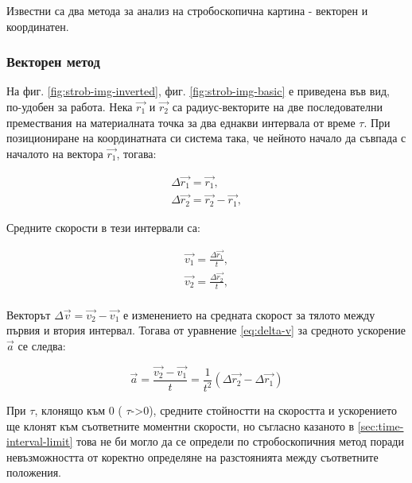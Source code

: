 \documentclass[12pt]{article}
\newcommand*{\fullref}[1]{\ref*{#1}} %
\begin{document}
Известни са два метода за анализ на стробоскопична картина - векторен и координатен.

\subsubsection{Векторен метод}
На фиг. \ref{fig:strob-img-inverted}, фиг. \ref{fig:strob-img-basic} е приведена във вид, по-удобен за работа. Нека \(\vec{r_1}\) и \(\vec{r_2}\) са радиус-векторите на две последователни премествания на материалната точка за два еднакви интервала от време \(\tau\). При позициониране на координатната си система така, че нейното начало да съвпада с началото на вектора \(\vec{r_1}\), тогава:

\begin{equation}\label{eq:delta-r}
\begin{aligned}
\Delta \vec{r_1} = \vec{r_1}, \\
\Delta \vec{r_2} = \vec{r_2} - \vec{r_1},
\end{aligned}
\end{equation}

Средните скорости в тези интервали са:

\begin{equation}\label{eq:delta-v}
\begin{aligned}
\vec{v_1} = \frac{\Delta \vec{r_1}}{t}, \\
\vec{v_2} = \frac{\Delta \vec{r_2}}{t}, \\
\end{aligned}
\end{equation}

Векторът \(\Delta \vec{v} = \vec{v_2} - \vec{v_1}\) е изменението на средната скорост за тялото между първия и втория интервал. Тогава от уравнение \ref{eq:delta-v} за средното ускорение \(\vec{a}\) се следва:

\begin{equation}\label{eq:a}
\vec{a} = \frac{\vec{v_2} - \vec{v_1}}{t} = \frac{1}{t^2}(\Delta \vec{r_2} - \Delta \vec{r_1})
\end{equation}

При  \(\tau\), клонящо към 0 ( \(\tau\)->0), средните стойностти на скоростта и ускорението ще клонят към съответните моментни скорости, но съгласно казаното в \fullref{sec:time-interval-limit} това не би могло да се определи по стробоскопичния метод поради невъзможността от коректно определяне на разстоянията между съответните положения.
\end{document}
